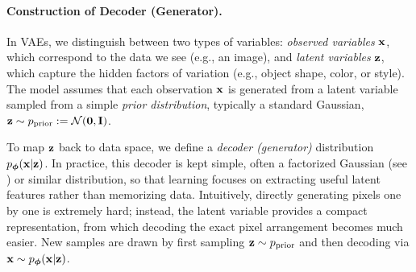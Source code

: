 \paragraph{Construction of Decoder (Generator).}



In VAEs, we distinguish between two types of variables: 
\emph{observed variables} ${\mathbf{x}}$, which correspond to the data we see (e.g., an image), 
and \emph{latent variables} ${\mathbf{z}}$, which capture the hidden factors of variation 
(e.g., object shape, color, or style). 
The model assumes that each observation ${\mathbf{x}}$ is generated from a latent variable 
sampled from a simple \emph{prior distribution}, typically a standard Gaussian, 
${\mathbf{z}} \sim p_{\text{prior}} := \mathcal{N}(\mathbf{0}, \mathbf{I})$.

To map ${\mathbf{z}}$ back to data space, we define a \emph{decoder (generator)} distribution 
$p_{\bm{\phi}}({\mathbf{x}}|{\mathbf{z}})$. In practice, this decoder is kept simple, often a 
factorized Gaussian (see ) or similar distribution, so that learning focuses on extracting 
useful latent features rather than memorizing data. 
Intuitively, directly generating pixels one by one is extremely hard; instead, the 
latent variable provides a compact representation, 
from which decoding the exact pixel arrangement becomes much easier. 
New samples are drawn by first sampling ${\mathbf{z}} \sim p_{\text{prior}}$ and then 
decoding via ${\mathbf{x}} \sim p_{\bm{\phi}}({\mathbf{x}}|{\mathbf{z}})$.

